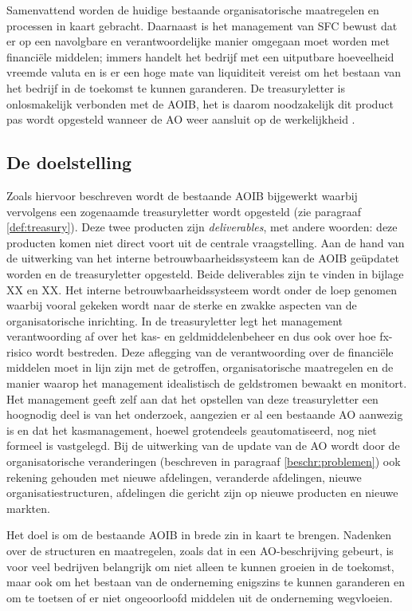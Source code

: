 Samenvattend worden de huidige bestaande organisatorische maatregelen en processen in kaart gebracht. Daarnaast is het management van SFC bewust dat er op een navolgbare en verantwoordelijke manier omgegaan moet worden met financiële middelen; immers handelt het bedrijf met een uitputbare hoeveelheid vreemde valuta en is er een hoge mate van liquiditeit vereist om het bestaan van het bedrijf in de toekomst te kunnen garanderen. De \gls{treasuryletter} is onlosmakelijk verbonden met de AOIB, het is daarom noodzakelijk dit product pas wordt opgesteld wanneer de AO weer aansluit op de werkelijkheid \citep{watisonderzoek,buunk,financiering}.

\subsection{De doelstelling}
Zoals hiervoor beschreven wordt de bestaande AOIB bijgewerkt waarbij vervolgens een zogenaamde \gls{treasuryletter} wordt opgesteld (zie paragraaf \ref{def:treasury}). Deze twee producten zijn \textit{deliverables}, met andere woorden: deze producten komen niet direct voort uit de centrale vraagstelling. Aan de hand van de uitwerking van het interne betrouwbaarheidssysteem kan de AOIB geüpdatet worden en de \gls{treasuryletter} opgesteld. {\color{red}Beide deliverables zijn te vinden in bijlage XX en XX.} 
Het interne betrouwbaarheidssysteem wordt onder de loep genomen waarbij vooral gekeken wordt naar de sterke en zwakke aspecten van de organisatorische inrichting. In de \gls{treasuryletter} legt het management verantwoording af over het kas- en geldmiddelenbeheer en dus ook over hoe \gls{fx}-risico wordt bestreden. Deze aflegging van de verantwoording over de financiële middelen moet in lijn zijn met de getroffen, organisatorische maatregelen en de manier waarop het management idealistisch de geldstromen bewaakt en monitort. Het management geeft zelf aan dat het opstellen van deze \gls{treasuryletter} een hoognodig deel is van het onderzoek, aangezien er al een bestaande AO aanwezig is en dat het kasmanagement, hoewel grotendeels geautomatiseerd, nog niet formeel is vastgelegd. Bij de uitwerking van de update van de AO wordt door de organisatorische veranderingen (beschreven in paragraaf \ref{beschr:problemen}) ook rekening gehouden met nieuwe afdelingen, veranderde afdelingen, nieuwe organisatiestructuren, afdelingen die gericht zijn op nieuwe producten en nieuwe markten.

Het doel is om de bestaande AOIB in brede zin in kaart te brengen. Nadenken over de structuren en maatregelen, zoals dat in een AO-beschrijving gebeurt, is voor veel bedrijven belangrijk om niet alleen te kunnen groeien in de toekomst, maar ook om het bestaan van de onderneming enigszins te kunnen garanderen en om te toetsen of er niet ongeoorloofd middelen uit de onderneming wegvloeien.

